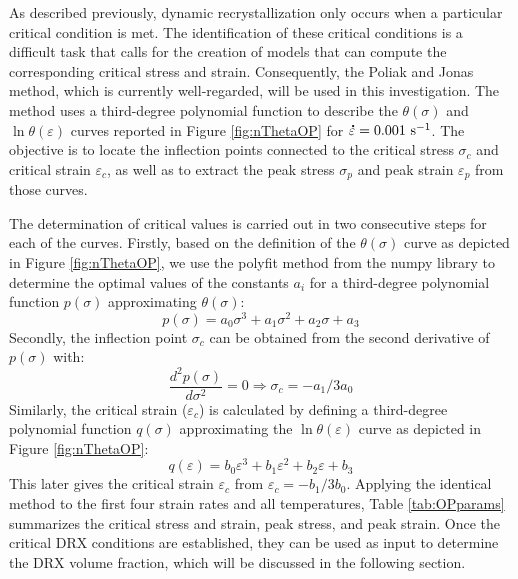 \documentclass[metals,article,submit,pdftex,moreauthors]{Definitions/mdpi}
\DeclareRobustCommand{\mdot}[1]{\accentset{\mbox{\bfseries .}}{#1}}
\DeclareRobustCommand{\ps}{\text{s}^{-1}}
\begin{document}
As described previously, dynamic recrystallization only occurs when a particular critical condition is met.
The identification of these critical conditions is a difficult task that calls for the creation of models that can compute the corresponding critical stress and strain.
Consequently, the Poliak and Jonas \cite{Poliak-1996,ei2003initiation,ei2003critical,jonas2003critical} method, which is currently well-regarded, will be used in this investigation.
The method uses a third-degree polynomial function to describe the $\theta(\sigma)$ and $\ln \theta(\varepsilon)$ curves reported in Figure \ref{fig:nThetaOP} for $\mdot\varepsilon=0.001~\ps$.
The objective is to locate the inflection points connected to the critical stress $\sigma_c$ and critical strain $\varepsilon_c$, as well as to extract the peak stress $\sigma_p$ and peak strain $\varepsilon_p$ from those curves.

The determination of critical values is carried out in two consecutive steps for each of the curves.
Firstly, based on the definition of the $\theta(\sigma)$ curve as depicted in Figure \ref{fig:nThetaOP}, we use the polyfit method from the numpy library to determine the optimal values of the constants $a_i$ for a third-degree polynomial function $p(\sigma)$ approximating $\theta(\sigma)$:
\begin{equation}
p(\sigma) = a_0\sigma^3 + a_1\sigma^2 + a_2\sigma + a_3
\end{equation}
Secondly, the inflection point $\sigma_c$ can be obtained from the second derivative of $p(\sigma)$ with:
\begin{equation}
\frac{d^2 p(\sigma)}{d \sigma^2} = 0 \Longrightarrow \sigma_c = -a_1/3a_0
\end{equation}
Similarly, the critical strain ($\varepsilon_c$) is calculated by defining a third-degree polynomial function $q(\sigma)$ approximating the $\ln \theta(\varepsilon)$ curve as depicted in Figure \ref{fig:nThetaOP}:
\begin{equation}
q(\varepsilon) = b_0\varepsilon^3 + b_1\varepsilon^2 + b_2\varepsilon + b_3
\end{equation}
This later gives the critical strain $\varepsilon_c$ from $\varepsilon_c = -b_1/3b_0$.
Applying the identical method to the first four strain rates and all temperatures, Table \ref{tab:OPparams} summarizes the critical stress and strain, peak stress, and peak strain.
Once the critical DRX conditions are established, they can be used as input to determine the DRX volume fraction, which will be discussed in the following section.
\end{document}
